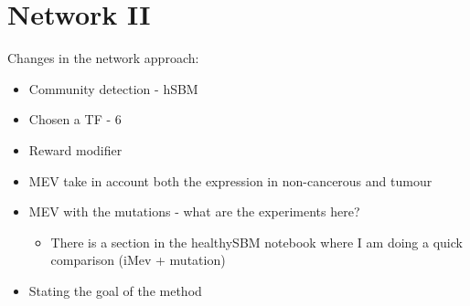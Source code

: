 
\section{Network II}

Changes in the network approach:
\begin{itemize}
    \item Community detection - hSBM
    \item Chosen a TF - 6
    \item Reward modifier
    \item MEV take in account both the expression in non-cancerous and tumour
    \item MEV with the mutations - what are the experiments here?
    \begin{itemize}
        \item There is a section in the healthySBM notebook where I am doing a quick comparison (iMev + mutation)
    \end{itemize}
    \item Stating the goal of the method
\end{itemize}

\hfill

